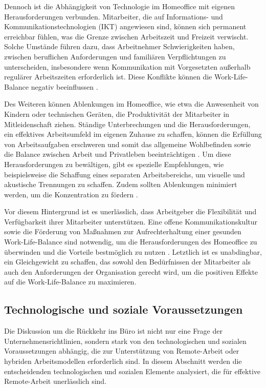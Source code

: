 Dennoch ist die Abhängigkeit von Technologie im Homeoffice mit eigenen Herausforderungen verbunden. Mitarbeiter, die auf Informations- und Kommunikationstechnologien (IKT) angewiesen sind, können sich permanent erreichbar fühlen, was die Grenze zwischen Arbeitszeit und Freizeit verwischt. Solche Umstände führen dazu, dass Arbeitnehmer Schwierigkeiten haben, zwischen beruflichen Anforderungen und familiären Verpflichtungen zu unterscheiden, insbesondere wenn Kommunikation mit Vorgesetzten außerhalb regulärer Arbeitszeiten erforderlich ist. Diese Konflikte können die Work-Life-Balance negativ beeinflussen \cite{7}.

Des Weiteren können Ablenkungen im Homeoffice, wie etwa die Anwesenheit von Kindern oder technischen Geräten, die Produktivität der Mitarbeiter in Mitleidenschaft ziehen. Ständige Unterbrechungen und die Herausforderungen, ein effektives Arbeitsumfeld im eigenen Zuhause zu schaffen, können die Erfüllung von Arbeitsaufgaben erschweren und somit das allgemeine Wohlbefinden sowie die Balance zwischen Arbeit und Privatleben beeinträchtigen \cite{file4}. Um diese Herausforderungen zu bewältigen, gibt es spezielle Empfehlungen, wie beispielsweise die Schaffung eines separaten Arbeitsbereichs, um visuelle und akustische Trennungen zu schaffen. Zudem sollten Ablenkungen minimiert werden, um die Konzentration zu fördern \cite{7}.

Vor diesem Hintergrund ist es unerlässlich, dass Arbeitgeber die Flexibilität und Verfügbarkeit ihrer Mitarbeiter unterstützen. Eine offene Kommunikationskultur sowie die Förderung von Maßnahmen zur Aufrechterhaltung einer gesunden Work-Life-Balance sind notwendig, um die Herausforderungen des Homeoffice zu überwinden und die Vorteile bestmöglich zu nutzen \cite{7}. Letztlich ist es unabdingbar, ein Gleichgewicht zu schaffen, das sowohl den Bedürfnissen der Mitarbeiter als auch den Anforderungen der Organisation gerecht wird, um die positiven Effekte auf die Work-Life-Balance zu maximieren.

\subsection{Technologische und soziale Voraussetzungen}  
Die Diskussion um die Rückkehr ins Büro ist nicht nur eine Frage der Unternehmensrichtlinien, sondern stark von den technologischen und sozialen Voraussetzungen abhängig, die zur Unterstützung von Remote-Arbeit oder hybriden Arbeitsmodellen erforderlich sind. In diesem Abschnitt werden die entscheidenden technologischen und sozialen Elemente analysiert, die für effektive Remote-Arbeit unerlässlich sind.

